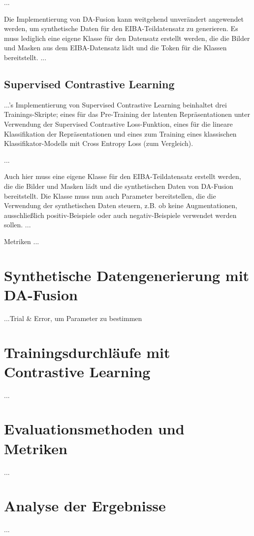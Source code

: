 ...

Die Implementierung von DA-Fusion kann weitgehend unverändert angewendet werden, um synthetische Daten für den EIBA-Teildatensatz zu generieren. Es muss lediglich eine eigene Klasse für den Datensatz erstellt werden, die die Bilder und Masken aus dem EIBA-Datensatz lädt und die Token für die Klassen bereitstellt. ...

\subsection{Supervised Contrastive Learning}

...'s Implementierung von Supervised Contrastive Learning beinhaltet drei Trainings-Skripte; eines für das Pre-Training der latenten Repräsentationen unter Verwendung der Supervised Contrastive Loss-Funktion, eines für die lineare Klassifikation der Repräsentationen und eines zum Training eines klassischen Klassifikator-Modells mit Cross Entropy Loss (zum Vergleich).

...

Auch hier muss eine eigene Klasse für den EIBA-Teildatensatz erstellt werden, die die Bilder und Masken lädt und die synthetischen Daten von DA-Fusion bereitstellt. Die Klasse muss nun auch Parameter bereitstellen, die die Verwendung der synthetischen Daten steuern, z.B. ob keine Augmentationen, ausschließlich positiv-Beispiele oder auch negativ-Beispiele verwendet werden sollen. ...

Metriken ...

\section{Synthetische Datengenerierung mit DA-Fusion}

...Trial & Error, um Parameter zu bestimmen

\section{Trainingsdurchläufe mit Contrastive Learning}

...

\section{Evaluationsmethoden und Metriken}

...

\section{Analyse der Ergebnisse}

...